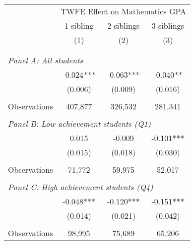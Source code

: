 \makeatletter
{}
{
\makeatother
\begin{tabular}{lccc}
\toprule
\cmidrule(lr){2-4}
& \multicolumn{3}{c}{TWFE Effect on Mathematics GPA} \\
\cmidrule(lr){2-4}
& 1 sibling & 2 siblings & 3 siblings  \\
\cmidrule(lr){2-2} \cmidrule(lr){3-3} \cmidrule(lr){4-4}
& (1) & (2) & (3)\\
\bottomrule
&  &  &  \\
&  &  &   \\
\multicolumn{4}{l}{\textit{Panel A: All students}} \\
\hspace{3mm}        &      -0.024***&      -0.063***&      -0.040** \\
                    &     (0.006)   &     (0.009)   &     (0.016)   \\
                    &               &               &               \\
\hspace{3mm}Observations&     407,877   &     326,532   &     281,341   \\
 
&  &  &   \\
\multicolumn{4}{l}{\textit{Panel B: Low achievement students (Q1)}} \\
\hspace{3mm}        &       0.015   &      -0.009   &      -0.101***\\
                    &     (0.015)   &     (0.018)   &     (0.030)   \\
                    &               &               &               \\
\hspace{3mm}Observations&      71,772   &      59,975   &      52,017   \\
 
&  &  &   \\
\multicolumn{4}{l}{\textit{Panel C: High achievement students (Q4)}} \\
\hspace{3mm}        &      -0.048***&      -0.120***&      -0.151***\\
                    &     (0.014)   &     (0.021)   &     (0.042)   \\
                    &               &               &               \\
\hspace{3mm}Observations&      98,995   &      75,689   &      65,206   \\
 

\end{tabular}}
